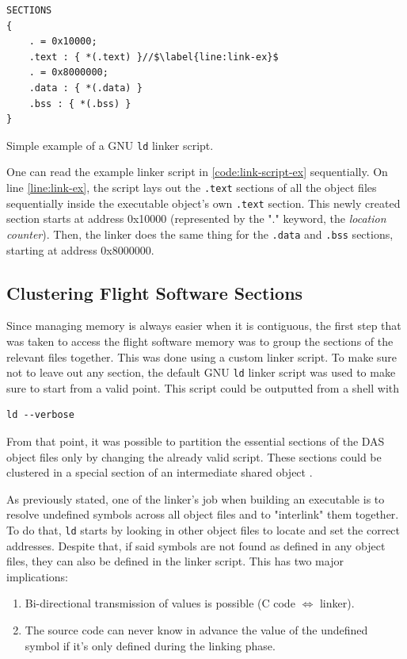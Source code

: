 {\begin{listing}[H]
	\vspace{12pt}
	\begin{verbatim}
SECTIONS
{
	. = 0x10000;
	.text : { *(.text) }//$\label{line:link-ex}$
	. = 0x8000000;
	.data : { *(.data) }
	.bss : { *(.bss) }
}
	\end{verbatim}
	\caption{Simple example of a GNU \texttt{ld} linker script.}
	\label{code:link-script-ex}
\end{listing}

One can read the example linker script in \autoref{code:link-script-ex}  sequentially. On line \ref{line:link-ex}, the script lays out the \texttt{.text} sections of all the object files sequentially inside the executable object's own \texttt{.text} section. This newly created section starts at address 0x10000 (represented by the "." keyword, the \textit{location counter}\cite{online:gnu-ld}). Then, the linker does the same thing for the \texttt{.data} and \texttt{.bss} sections, starting at address 0x8000000.

\subsection*{Clustering Flight Software Sections}
Since managing memory is always easier when it is contiguous, the first step that was taken to access the flight software memory was to group the sections of the relevant files together. This was done using a custom linker script. To make sure not to leave out any section, the default GNU \texttt{ld} linker script was used to make sure to start from a valid point. This script could be outputted from a shell with 
\begin{verbatim}
ld --verbose
\end{verbatim}
From that point, it was possible to partition the essential sections of the DAS object files only by changing the already valid script. These sections could be clustered in a special section of an intermediate shared object . 

As previously stated, one of the linker's job when building an executable is to resolve undefined symbols across all object files and to "interlink" them together. To do that, \texttt{ld} starts by looking in other object files to locate and set the correct addresses. Despite that, if said symbols are not found as defined in any object files, they can also be defined in the linker script. This has two major implications: 
\begin{enumerate}
	\item Bi-directional transmission of values is possible (C code $\Longleftrightarrow$ linker).
	\item The source code can never know in advance the value of the undefined symbol if it's only defined during the linking phase.
\end{enumerate}

}
